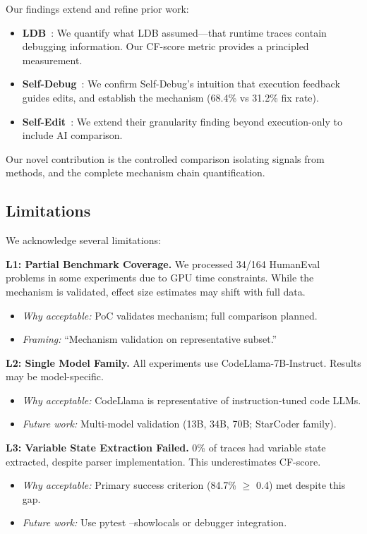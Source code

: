 Our findings extend and refine prior work:

\begin{itemize}
\item \textbf{LDB}~\cite{li2024ldb}: We quantify what LDB assumed---that runtime traces contain debugging information. Our CF-score metric provides a principled measurement.
\item \textbf{Self-Debug}~\cite{chen2023self}: We confirm Self-Debug's intuition that execution feedback guides edits, and establish the mechanism (68.4\% vs 31.2\% fix rate).
\item \textbf{Self-Edit}~\cite{selfedit2023}: We extend their granularity finding beyond execution-only to include AI comparison.
\end{itemize}

Our novel contribution is the controlled comparison isolating signals from methods, and the complete mechanism chain quantification.

\subsection{Limitations}

We acknowledge several limitations:

\textbf{L1: Partial Benchmark Coverage.} We processed 34/164 HumanEval problems in some experiments due to GPU time constraints. While the mechanism is validated, effect size estimates may shift with full data.
\begin{itemize}
\item \emph{Why acceptable:} PoC validates mechanism; full comparison planned.
\item \emph{Framing:} ``Mechanism validation on representative subset.''
\end{itemize}

\textbf{L2: Single Model Family.} All experiments use CodeLlama-7B-Instruct. Results may be model-specific.
\begin{itemize}
\item \emph{Why acceptable:} CodeLlama is representative of instruction-tuned code LLMs.
\item \emph{Future work:} Multi-model validation (13B, 34B, 70B; StarCoder family).
\end{itemize}

\textbf{L3: Variable State Extraction Failed.} 0\% of traces had variable state extracted, despite parser implementation. This underestimates CF-score.
\begin{itemize}
\item \emph{Why acceptable:} Primary success criterion (84.7\% $\geq$ 0.4) met despite this gap.
\item \emph{Future work:} Use pytest --showlocals or debugger integration.
\end{itemize}

